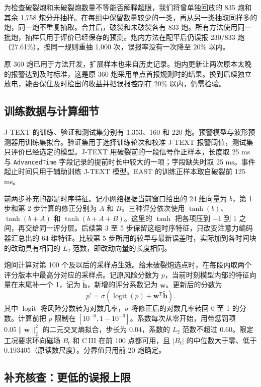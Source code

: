 为检查破裂炮和未破裂炮数量不等能否解释超限，我们将曾单独回放的 835 炮和其余 1,758 炮分开抽样。在每组中保留数量较少的一类，再从另一类抽取同样多的炮，同一炮不重复抽取。合并后，破裂和未破裂各有 833 炮。所有方法使用同一批炮，抽样只用于评价已经保存的预测。炮内方法在配平后仍误报 230/833 炮（27.61\%）。按同一规则重抽 1,000 次，误报率没有一次降至 20\% 以内。

原 360 炮已用于方法开发，扩展样本也来自历史记录。炮内更新让两次原本太晚的报警达到及时标准，这是原 360 炮采用单点首报规则时的结果。换到后续独立放电，能否保住及时检出的收益并把误报控制在 20\% 以内，仍需检验。

\subsection{训练数据与计算细节}

J-TEXT 的训练、验证和测试集分别有 1,353、160 和 220 炮。预警模型与波形预测器用训练集拟合。验证集用于选择训练轮次和校准 J-TEXT 报警阈值，测试集只评价已经选定的模型。J-TEXT 用破裂前的一段信号作正样本，长度取 25 ms 与 \texttt{AdvancedTime} 字段记录的提前时长中较大的一项；字段缺失时取 25 ms。事件起止时间只用于辅助训练 J-TEXT 模型。EAST 的训练正样本取自破裂前 125 ms。

前两步补充的都是时序特征。记小网络根据当前窗口给出的 24 维向量为 \(b\)，第 1 步和第 2 步计算的修正分别为 \(A\) 和 \(B\)。三种评分依次使用 \(\tanh(b)\)、\(\tanh(b+A)\) 和 \(\tanh(b+A+B)\)。这里的 \(\tanh\) 把各项压到 \(-1\) 到 \(1\) 之间，再交给同一评分层。后续第 3 至 5 步保留这组时序特征，只改变注意力编码器汇总出的 64 维特征。比较第 5 步所用的较早与最新误差时，实际加到各时间块的改动具有相同的 \(L_2\) 范数，即改动向量的长度相同。

炮间计算对第 100 个及以后的采样点生效。给未破裂炮选点时，在每段内取两个评分版本中最高分对应的采样点。记原风险分数为 \(p\)，当前时刻模型内部的特征向量在末尾补一个 1，记为 \(\tilde{\mathbf h}\)，新增的评分系数记为 \(\mathbf w\)。更新后的分数为
\[
 p'=\sigma\!\left(\operatorname{logit}(p)+\mathbf w^{\mathsf T}\tilde{\mathbf h}\right).
\]
其中 \(\operatorname{logit}\) 将风险分数转为对数几率，\(\sigma\) 将修正后的对数几率转回 0 至 1 的分数。计算前把 \(p\) 限制在 \([10^{-6},1-10^{-6}]\)。系数每次从零开始，用带惩罚项 \(0.05\lVert\mathbf w\rVert_2^2\) 的二元交叉熵拟合，步长为 0.04，系数的 \(L_2\) 范数不超过 0.60。限定工况要求环向磁场 \(B_t\) 和 C\,III 在前 100 点都可用，且 \(\lvert B_t\rvert\) 的中位数大于零、低于 0.193405（原读数尺度）。分界值只用前 20 炮确定。

\subsection{补充核查：更低的误报上限}

